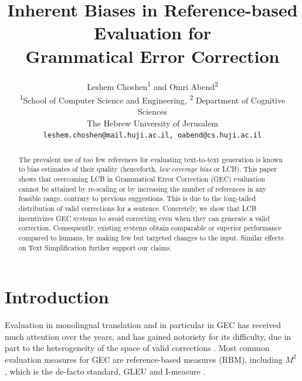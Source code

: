 \documentclass[a4paper]{article}
\begin{document}
\title{Inherent Biases in Reference-based Evaluation for \\ Grammatical Error Correction}
\author{
  Leshem Choshen\textsuperscript{1} and Omri Abend\textsuperscript{2} \\
  \textsuperscript{1}School of Computer Science and Engineering,
  \textsuperscript{2} Department of Cognitive Sciences \\
  The Hebrew University of Jerusalem \\
  \texttt{leshem.choshen@mail.huji.ac.il, oabend@cs.huji.ac.il}\\
}
\maketitle

	\begin{abstract}
		The prevalent use of too few references for evaluating text-to-text
		generation is known to bias estimates of their quality (henceforth, {\it low
		  coverage bias} or LCB). This paper shows that overcoming LCB in
		Grammatical Error Correction (GEC) evaluation cannot be attained by
		re-scaling or by increasing the number of references in any feasible
		range, contrary to previous suggestions. This is due to the long-tailed distribution of valid corrections for a sentence.
		Concretely, we show that LCB incentivizes GEC systems to avoid
    correcting even when they can generate a valid correction. 
    Consequently, existing systems obtain comparable or
		superior performance compared to humans, by making few but targeted 
		changes to the input.
		Similar effects on Text Simplification further support our claims.
	\end{abstract}

	\section{Introduction}
	
	Evaluation in monolingual translation \cite{xu2015problems,inderjeet2009summarization} and
	in particular in GEC
	\cite{tetreault2008native,madnani2011they,felice2015towards,bryant2015far,napoles2015ground}
	has received much attention over the years, and has gained notoriety for its difficulty,
	due in part to the heterogeneity of the space of valid corrections \cite{chodorow2012problems}.
	Most common evaluation measures for GEC are reference-based measures (RBM), including
  $M^2$ \cite{dahlmeier2012better}, which is the de-facto standard, GLEU \cite{napoles2015ground} 
  and I-measure \cite{felice2015towards}.
	
\end{document}
